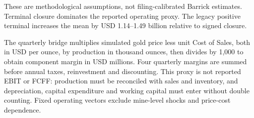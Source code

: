 \begin{methodbox}[Interpretation]
These are methodological assumptions, not filing-calibrated Barrick estimates. Terminal closure dominates the reported operating proxy. The legacy positive terminal increases the mean by USD 1.14--1.49 billion relative to signed closure.
\end{methodbox}

The quarterly bridge multiplies simulated gold price less unit Cost of Sales, both in USD per ounce, by production in thousand ounces, then divides by 1,000 to obtain component margin in USD millions. Four quarterly margins are summed before annual taxes, reinvestment and discounting. This proxy is not reported EBIT or FCFF: production must be reconciled with sales and inventory, and depreciation, capital expenditure and working capital must enter without double counting. Fixed operating vectors exclude mine-level shocks and price-cost dependence.
